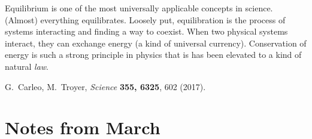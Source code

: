 \documentclass[nofootinbib, superscriptaddress, prl]{revtex4}
\begin{document}
Equilibrium is one of the most universally applicable concepts in science. (Almost) everything equilibrates. Loosely put, equilibration is the process of systems interacting and finding a way to coexist. When two physical systems interact, they can exchange energy (a kind of universal currency). Conservation of energy is such a strong principle in physics that is has been elevated to a kind of natural \emph{law}.

\begin{thebibliography}{10}
G.~Carleo, M.~Troyer, {\it Science\/} {\bf 355, 6325}, 602
  (2017).
\end{thebibliography}



\newpage
\section{Notes from March}
\end{document}
